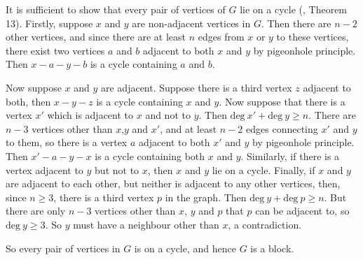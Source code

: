 It is sufficient to show that every pair of vertices of $G$ lie on a cycle
(\cite{notes}, Theorem 13). Firstly, suppose $x$ and $y$ are non-adjacent
vertices in $G$. Then there are $n-2$ other vertices, and since there are
at least $n$ edges from $x$ or $y$ to these vertices, there exist
two vertices $a$ and $b$ adjacent to both $x$ and $y$ by pigeonhole 
principle. Then $x-a-y-b$ is a cycle containing $a$ and $b$.

Now suppose $x$ and $y$ are adjacent. Suppose there is a third vertex $z$
adjacent to both, then $x-y-z$ is a cycle containing $x$ and $y$.
Now suppose that there is a vertex $x'$ which is adjacent to $x$ and not
to $y$. Then $\text{deg}\ x'+\text{deg}\ y \ge n$. There are $n-3$ vertices
other than $x$,$y$ and $x'$, and at least $n-2$ edges connecting $x'$ and
$y$ to them, so there is a vertex $a$ adjacent to both $x'$ and $y$ by 
pigeonhole principle. Then
$x'-a-y-x$ is a cycle containing both $x$ and $y$. Similarly, if there is
a vertex adjacent to $y$ but not to $x$, then $x$ and $y$ lie on a cycle.
Finally, if $x$ and $y$ are adjacent to each other, but neither is adjacent
to any other vertices, then, since $n\ge 3$, there is a third vertex $p$
in the graph. Then $\text{deg}\ y+\text{deg}\ p \ge n$. But there are
only $n-3$ vertices other than $x$, $y$ and $p$ that $p$ can be adjacent
to, so $\text{deg}\ y \ge 3$. So $y$ must have a neighbour other than $x$,
a contradiction.

So every pair of vertices in $G$ is on a cycle, and hence $G$ is a block.
